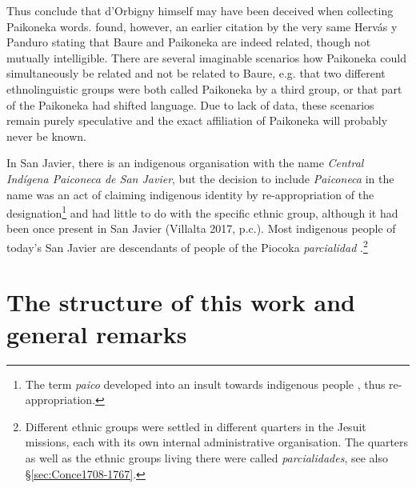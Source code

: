 Thus \citet[33]{RamirezFranca2019} conclude that d’Orbigny himself may have been deceived when collecting Paikoneka words. \citet[]{Danielsen2020} found, however, an earlier citation by the very same Hervás y Panduro stating that Baure and Paikoneka are indeed related, though not mutually intelligible. There are several imaginable scenarios how Paikoneka could simultaneously be related and not be related to Baure, e.g. that two different ethnolinguistic groups were both called Paikoneka by a third group, or that part of the Paikoneka had shifted language. Due to lack of data, these scenarios remain purely speculative and the exact affiliation of Paikoneka will probably never be known.

In San Javier, there is an indigenous organisation with the name \textit{Central Indígena Paiconeca de San Javier}, but the decision to include \textit{Paiconeca} in the name was an act of claiming indigenous identity by re-appropriation of the designation\footnote{The term \textit{paico} developed into an insult towards indigenous people \citep[104, fn. 31]{FussRiester1986}, thus re-appropriation.} and had little to do with the specific ethnic group, although it had been once present in San Javier (Villalta 2017, p.c.). Most indigenous people of today’s San Javier are descendants of people of the Piocoka \textit{parcialidad} \citep[7]{Villalta2013}.\footnote{Different ethnic groups were settled in different quarters in the Jesuit missions, each with its own internal administrative organisation. The quarters as well as the ethnic groups living there were called \textit{parcialidades}, see also §\ref{sec:Conce1708-1767}.}




\section{The structure of this work and general remarks}\label{sec:StructureWork}

